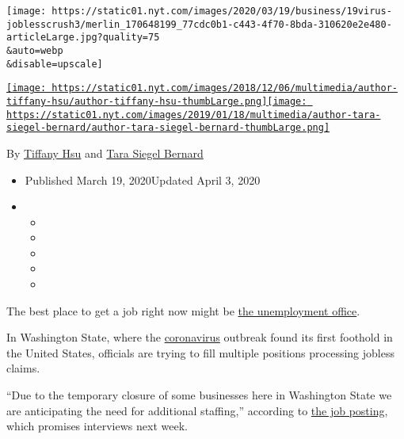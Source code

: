 \texttt{[image: https://static01.nyt.com/images/2020/03/19/business/19virus-joblesscrush3/merlin\_170648199\_77cdc0b1-c443-4f70-8bda-310620e2e480-articleLarge.jpg?quality=75\\\&auto=webp\\\&disable=upscale]}

\href{https://www.nytimes.com/by/tiffany-hsu}{\texttt{[image: https://static01.nyt.com/images/2018/12/06/multimedia/author-tiffany-hsu/author-tiffany-hsu-thumbLarge.png]}}\href{https://www.nytimes.com/by/tara-siegel-bernard}{\texttt{[image: https://static01.nyt.com/images/2019/01/18/multimedia/author-tara-siegel-bernard/author-tara-siegel-bernard-thumbLarge.png]}}

By \href{https://www.nytimes.com/by/tiffany-hsu}{Tiffany Hsu} and
\href{https://www.nytimes.com/by/tara-siegel-bernard}{Tara Siegel
Bernard}

\begin{itemize}
\item
  Published March 19, 2020Updated April 3, 2020
\item
  \begin{itemize}
  \item
  \item
  \item
  \item
  \item
  \end{itemize}
\end{itemize}

The best place to get a job right now might be
\href{https://www.nytimes.com/interactive/2020/03/19/upshot/coronavirus-jobless-claims-states.html}{the
unemployment office}.

In Washington State, where the
\href{https://www.nytimes.com/2020/04/03/upshot/coronavirus-jobless-rate-great-depression.html}{coronavirus}
outbreak found its first foothold in the United States, officials are
trying to fill multiple positions processing jobless claims.

``Due to the temporary closure of some businesses here in Washington
State we are anticipating the need for additional staffing,'' according
to
\href{https://www.linkedin.com/jobs/view/1784435892/?eBP=NotAvailableFromVoyagerAPI\&refId=5127803b-7fa9-4b25-b20c-df682ddc6057\&trk=d_flagship3_search_srp_jobs}{the
job posting}, which promises interviews next week.

